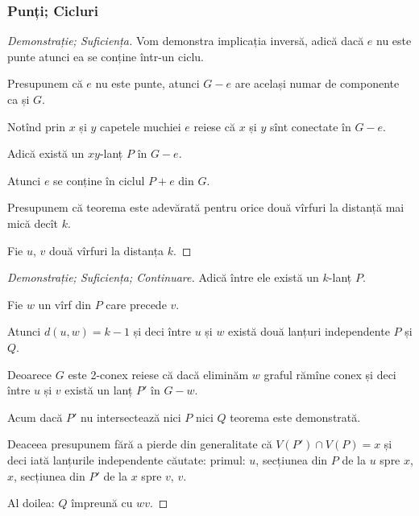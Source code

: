 \begin{frame}
  \frametitle{Punți; Cicluri}

\begin{proof}[Demonstrație; Suficiența]
Vom demonstra implicația inversă, adică dacă $e$ nu este punte atunci ea se conține într-un ciclu. \pause

Presupunem că $e$ nu este punte, atunci $G-e$ are același numar de componente ca și $G$. \pause

Notînd prin $x$ și $y$ capetele muchiei $e$ reiese că $x$ și $y$ sînt conectate în $G-e$.\pause

Adică există un $xy$-lanț $P$ în $G-e$.\pause
 
Atunci $e$ se conține în ciclul $P+e$ din $G$.\pause

Presupunem că teorema este adevărată pentru orice două vîrfuri la distanță mai mică decît $k$. \pause

Fie $u$, $v$ două vîrfuri la distanța $k$. 

\end{proof} 
 
\end{frame}

\begin{frame}

\begin{proof}[Demonstrație; Suficiența; Continuare]

Adică între ele există un $k$-lanț $P$. \pause

Fie $w$ un vîrf din $P$ care precede $v$. \pause

Atunci $d(u,w)=k-1$ și deci între $u$ și $w$ există două lanțuri independente $P$ și $Q$. \pause

Deoarece $G$ este 2-conex reiese că dacă eliminăm $w$ graful rămîne conex și deci între $u$ și $v$ există un lanț $P'$ în $G-w$.\pause

Acum dacă $P'$ nu intersectează nici $P$ nici $Q$ teorema este demonstrată. \pause

Deaceea presupunem fără a pierde din generalitate că $V(P')\cap V(P)=x$ și deci iată lanțurile independente căutate: primul: $u$, secțiunea din $P$ de la $u$ spre $x$, $x$, secțiunea din $P'$ de la $x$ spre $v$, $v$.\pause

Al doilea: $Q$ împreună cu $wv$.
 
\end{proof}

 
\end{frame}







